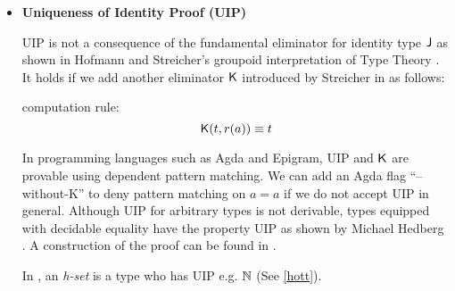 \begin{itemize}



\item \textbf{Uniqueness of Identity Proof (UIP)}\label{UIPdetail}






UIP is not a consequence of the fundamental eliminator for identity type $\operatorname{\mathsf{J}}$ as shown in Hofmann and Streicher's groupoid interpretation of Type Theory \cite{MR1686862}. It holds if we add another eliminator $\operatorname{\mathsf{K}}$ introduced by Streicher in \cite{streicherinvestigations} as follows:



computation rule:
$$\operatorname{\mathsf{K}} (t , r(a)) \equiv t$$

In programming languages such as Agda and Epigram, UIP and $\operatorname{\mathsf{K}}$ are provable using dependent pattern matching. We can add an Agda flag ``--without-K'' to deny pattern matching on $a = a$ if we do not accept UIP in general. 
Although UIP for arbitrary types is not derivable, types equipped with decidable equality have the property UIP as shown by Michael Hedberg \cite{hed:98}.
A construction of the proof can be found in \cite{NisseHedberg}.

In \hott, an \emph{h-set} is a type who has UIP e.g. $\mathbb{N}$ (See \autoref{hott}).



\end{itemize}
